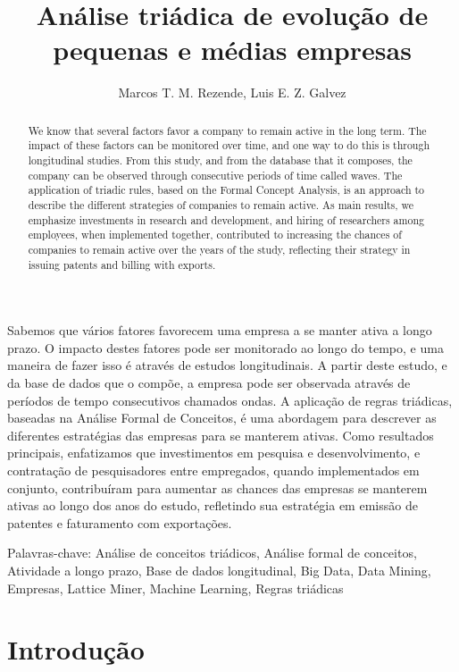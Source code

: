 \documentclass[12pt]{article}
\title{Análise triádica de evolução de pequenas e médias empresas}
\author{Marcos T. M. Rezende\inst{1}, Luis E. Z. Galvez\inst{1}}
\providecommand{\keywords}[1]
{
  Palavras-chave: #1
}
\begin{document}
 

\maketitle

\begin{resumo} 
  Sabemos que vários fatores favorecem uma empresa a se manter ativa a longo prazo. O impacto destes fatores pode ser monitorado ao longo do tempo, e uma maneira de fazer isso é através de estudos longitudinais. A partir deste estudo, e da base de dados que o compõe, a empresa pode ser observada através de períodos de tempo consecutivos chamados ondas. A aplicação de regras triádicas, baseadas na Análise Formal de Conceitos, é uma abordagem para descrever as diferentes estratégias das empresas para se manterem ativas. Como resultados principais, enfatizamos que investimentos em pesquisa e desenvolvimento, e contratação de pesquisadores entre empregados, quando implementados em conjunto, contribuíram para aumentar as chances das empresas se manterem ativas ao longo dos anos do estudo, refletindo sua estratégia em emissão de patentes e faturamento com exportações.
\end{resumo}


\begin{abstract}
    We know that several factors favor a company to remain active in the long term. The impact of these factors can be monitored over time, and one way to do this is through longitudinal studies. From this study, and from the database that it composes, the company can be observed through consecutive periods of time called waves. The application of triadic rules, based on the Formal Concept Analysis, is an approach to describe the different strategies of companies to remain active. As main results, we emphasize investments in research and development, and hiring of researchers among employees, when implemented together, contributed to increasing the chances of companies to remain active over the years of the study, reflecting their strategy in issuing patents and billing with exports.
\end{abstract}

\keywords{Análise de conceitos triádicos, Análise formal de conceitos, Atividade a longo prazo, Base de dados longitudinal, Big Data, Data Mining, Empresas, Lattice Miner, Machine Learning, Regras triádicas}

\section{Introdução}
\end{document}
